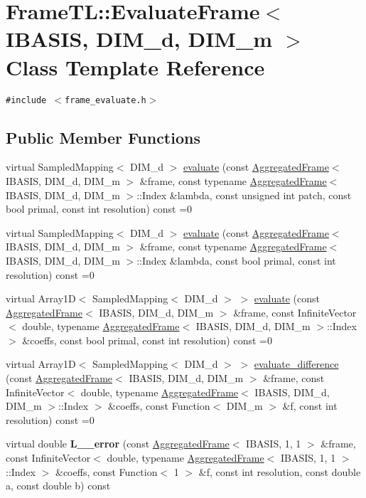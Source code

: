 \hypertarget{classFrameTL_1_1EvaluateFrame}{
\section{FrameTL::EvaluateFrame$<$ IBASIS, DIM\_\-d, DIM\_\-m $>$ Class Template Reference}
\label{classFrameTL_1_1EvaluateFrame}
}
{\tt \#include $<$frame\_\-evaluate.h$>$}

\subsection*{Public Member Functions}
\begin{CompactItemize}
\item 
virtual SampledMapping$<$ DIM\_\-d $>$ \hyperlink{classFrameTL_1_1EvaluateFrame_974094ff59dc684362f5237ea8813014}{evaluate} (const \hyperlink{classFrameTL_1_1AggregatedFrame}{AggregatedFrame}$<$ IBASIS, DIM\_\-d, DIM\_\-m $>$ \&frame, const typename \hyperlink{classFrameTL_1_1AggregatedFrame}{AggregatedFrame}$<$ IBASIS, DIM\_\-d, DIM\_\-m $>$::Index \&lambda, const unsigned int patch, const bool primal, const int resolution) const =0
\item 
virtual SampledMapping$<$ DIM\_\-d $>$ \hyperlink{classFrameTL_1_1EvaluateFrame_3315369302b4dfb8e73a7dae1658fc20}{evaluate} (const \hyperlink{classFrameTL_1_1AggregatedFrame}{AggregatedFrame}$<$ IBASIS, DIM\_\-d, DIM\_\-m $>$ \&frame, const typename \hyperlink{classFrameTL_1_1AggregatedFrame}{AggregatedFrame}$<$ IBASIS, DIM\_\-d, DIM\_\-m $>$::Index \&lambda, const bool primal, const int resolution) const =0
\item 
virtual Array1D$<$ SampledMapping$<$ DIM\_\-d $>$ $>$ \hyperlink{classFrameTL_1_1EvaluateFrame_e7bdc20b6e85b3c4a81511a234040467}{evaluate} (const \hyperlink{classFrameTL_1_1AggregatedFrame}{AggregatedFrame}$<$ IBASIS, DIM\_\-d, DIM\_\-m $>$ \&frame, const InfiniteVector$<$ double, typename \hyperlink{classFrameTL_1_1AggregatedFrame}{AggregatedFrame}$<$ IBASIS, DIM\_\-d, DIM\_\-m $>$::Index $>$ \&coeffs, const bool primal, const int resolution) const =0
\item 
virtual Array1D$<$ SampledMapping$<$ DIM\_\-d $>$ $>$ \hyperlink{classFrameTL_1_1EvaluateFrame_c61439dafa2ec4fa0793589ee3a84751}{evaluate\_\-difference} (const \hyperlink{classFrameTL_1_1AggregatedFrame}{AggregatedFrame}$<$ IBASIS, DIM\_\-d, DIM\_\-m $>$ \&frame, const InfiniteVector$<$ double, typename \hyperlink{classFrameTL_1_1AggregatedFrame}{AggregatedFrame}$<$ IBASIS, DIM\_\-d, DIM\_\-m $>$::Index $>$ \&coeffs, const Function$<$ DIM\_\-m $>$ \&f, const int resolution) const =0
\item 
\hypertarget{classFrameTL_1_1EvaluateFrame_4fc34092132a9f27407e50eb016071a3}{
virtual double \textbf{L\_\_\-error} (const \hyperlink{classFrameTL_1_1AggregatedFrame}{AggregatedFrame}$<$ IBASIS, 1, 1 $>$ \&frame, const InfiniteVector$<$ double, typename \hyperlink{classFrameTL_1_1AggregatedFrame}{AggregatedFrame}$<$ IBASIS, 1, 1 $>$::Index $>$ \&coeffs, const Function$<$ 1 $>$ \&f, const int resolution, const double a, const double b) const }
\label{classFrameTL_1_1EvaluateFrame_4fc34092132a9f27407e50eb016071a3}


\end{CompactItemize}
